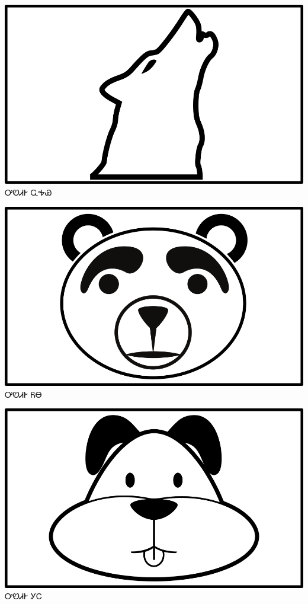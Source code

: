 \documentclass[avery5371]{flashcards}%
\begin{document}
    \begin{flashcard}{
        \includegraphics[width=0.95\columnwidth,height=.51\columnwidth,keepaspectratio]{../artwork/objects-animate/wahya}
    }
        \Huge ᎤᏬᏗᎨ ᏩᎭᏯ
    \end{flashcard}

    \begin{flashcard}{
        \includegraphics[width=0.95\columnwidth,height=.51\columnwidth,keepaspectratio]{../artwork/objects-animate/yona}
    }
        \Huge ᎤᏬᏗᎨ ᏲᎾ
    \end{flashcard}

    \begin{flashcard}{
        \includegraphics[width=0.95\columnwidth,height=.51\columnwidth,keepaspectratio]{../artwork/objects-animate/gihli}
    }
        \Huge ᎤᏬᏗᎨ ᎩᏟ
    \end{flashcard}
\end{document}
